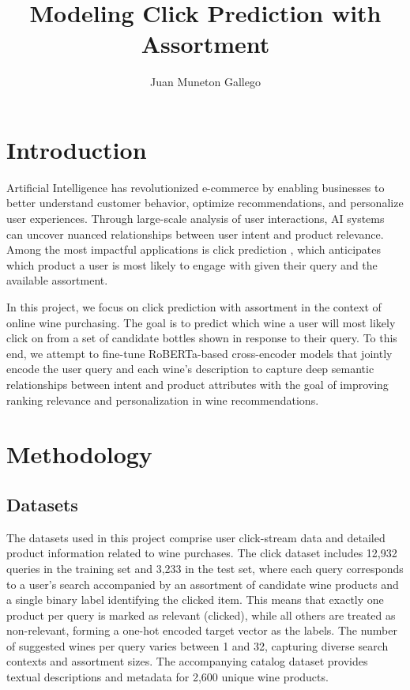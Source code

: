\documentclass[10pt]{article}
\title{Modeling Click Prediction with Assortment}
\author{Juan Muneton Gallego}
\date{}
\begin{document}
\maketitle

\section*{Introduction}
Artificial Intelligence has revolutionized e-commerce by enabling businesses to better understand customer behavior, optimize recommendations, and personalize user experiences. Through large-scale analysis of user interactions, AI systems can uncover nuanced relationships between user intent and product relevance. Among the most impactful applications is click prediction \cite{Bai_Geng_Deng_Xia_Jiang_Yan_Liang_2025}, which anticipates which product a user is most likely to engage with given their query and the available assortment.

In this project, we focus on click prediction with assortment in the context of online wine purchasing. The goal is to predict which wine a user will most likely click on from a set of candidate bottles shown in response to their query. To this end, we attempt to fine-tune RoBERTa-based cross-encoder models \cite{liu2019robertarobustlyoptimizedbert} that jointly encode the user query and each wine's description to capture deep semantic relationships between intent and product attributes with the goal of improving ranking relevance and personalization in wine recommendations.

\section*{Methodology}
\subsection*{Datasets}
The datasets used in this project comprise user click-stream data and detailed product information related to wine purchases. The click dataset includes 12,932 queries in the training set and 3,233 in the test set, where each query corresponds to a user's search accompanied by an assortment of candidate wine products and a single binary label identifying the clicked item. This means that exactly one product per query is marked as relevant (clicked), while all others are treated as non-relevant, forming a one-hot encoded target vector as the labels. The number of suggested wines per query varies between 1 and 32, capturing diverse search contexts and assortment sizes. The accompanying catalog dataset provides textual descriptions and metadata for 2,600 unique wine products.
\end{document}
